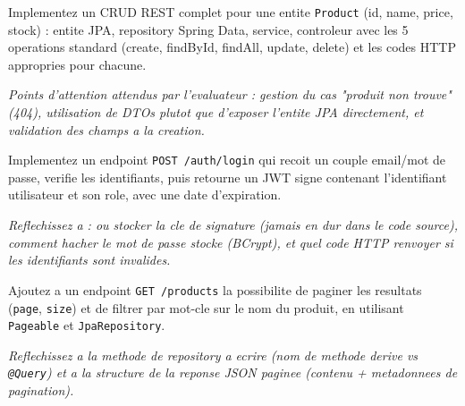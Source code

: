 \documentclass[11pt,a4paper]{article}
\begin{document}
\begin{coding}
Implementez un CRUD REST complet pour une entite \texttt{Product} (id, name, price, stock) : entite JPA, repository Spring Data, service, controleur avec les 5 operations standard (create, findById, findAll, update, delete) et les codes HTTP appropries pour chacune.

\emph{Points d'attention attendus par l'evaluateur : gestion du cas "produit non trouve" (404), utilisation de DTOs plutot que d'exposer l'entite JPA directement, et validation des champs a la creation.}
\end{coding}

\begin{coding}
Implementez un endpoint \texttt{POST /auth/login} qui recoit un couple email/mot de passe, verifie les identifiants, puis retourne un JWT signe contenant l'identifiant utilisateur et son role, avec une date d'expiration.

\emph{Reflechissez a : ou stocker la cle de signature (jamais en dur dans le code source), comment hacher le mot de passe stocke (BCrypt), et quel code HTTP renvoyer si les identifiants sont invalides.}
\end{coding}

\begin{coding}
Ajoutez a un endpoint \texttt{GET /products} la possibilite de paginer les resultats (\texttt{page}, \texttt{size}) et de filtrer par mot-cle sur le nom du produit, en utilisant \texttt{Pageable} et \texttt{JpaRepository}.

\emph{Reflechissez a la methode de repository a ecrire (nom de methode derive vs \texttt{@Query}) et a la structure de la reponse JSON paginee (contenu + metadonnees de pagination).}
\end{coding}
\end{document}
